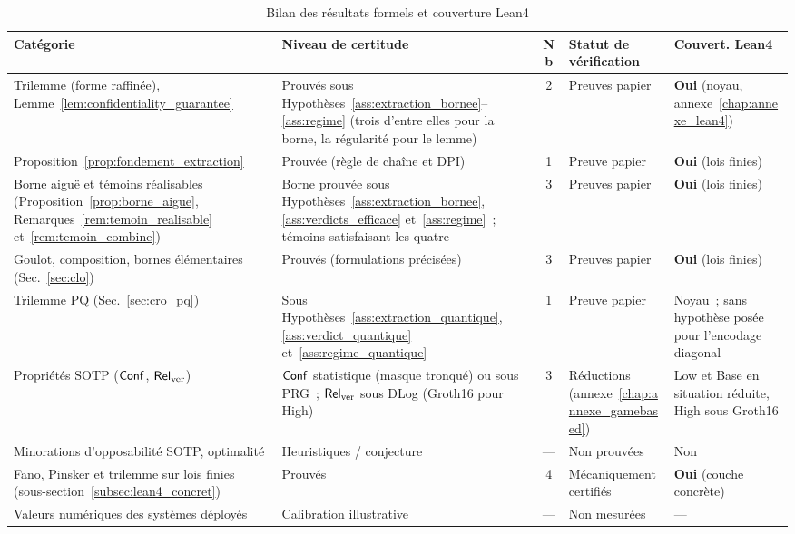 \begin{sloppypar}
\begin{table}[htbp]
\centering
\caption{Bilan des r\'esultats formels et couverture Lean4}
\label{tab:hierarchie_certitude}
\small
\setlength{\tabcolsep}{4pt}     %
\begin{tabular}{@{}p{2.8cm}p{2.8cm}c p{2.5cm}p{2.6cm}@{}}
\toprule
\textbf{Cat\'egorie} & \textbf{Niveau de certitude} & \textbf{Nb} &
\textbf{Statut de v\'erification} & \textbf{Couvert. Lean4} \\
\midrule
Trilemme (forme raffin\'ee), Lemme~\ref{lem:confidentiality_guarantee}
    & Prouv\'es sous Hypoth\`eses~\ref{ass:extraction_bornee}--\ref{ass:regime} (trois d'entre elles pour la borne, la r\'egularit\'e pour le lemme)
  & 2 & Preuves papier  
  & \textbf{Oui} (noyau, annexe~\ref{chap:annexe_lean4}) \\
Proposition~\ref{prop:fondement_extraction}
  & Prouv\'ee (r\`egle de cha\^ine et DPI)
  & 1 & Preuve papier & \textbf{Oui} (lois finies) \\
Borne aigu\"e et t\'emoins r\'ealisables (Proposition~\ref{prop:borne_aigue}, Remarques~\ref{rem:temoin_realisable} et~\ref{rem:temoin_combine})
  & Borne prouv\'ee sous Hypoth\`eses~\ref{ass:extraction_bornee}, \ref{ass:verdicts_efficace} et~\ref{ass:regime}~; t\'emoins satisfaisant les quatre
  & 3 & Preuves papier & \textbf{Oui} (lois finies) \\
Goulot, composition, bornes \'el\'ementaires (Sec.~\ref{sec:clo})  
  & Prouv\'es (formulations pr\'ecis\'ees) 
  & 3 & Preuves papier 
  & \textbf{Oui} (lois finies) \\
Trilemme PQ (Sec.~\ref{sec:cro_pq}) 
    & Sous Hypoth\`eses~\ref{ass:extraction_quantique}, \ref{ass:verdict_quantique} et~\ref{ass:regime_quantique}  
  & 1 & Preuve papier & Noyau~; sans hypoth\`ese pos\'ee pour l'encodage diagonal \\
Propri\'et\'es SOTP ($\mathsf{Conf}$, $\mathsf{Rel}_{\mathrm{ver}}$) 
  & $\mathsf{Conf}$ statistique (masque tronqu\'e) ou sous PRG~; $\mathsf{Rel}_{\mathrm{ver}}$ sous DLog (Groth16 pour High) 
  & 3 & R\'eductions (annexe~\ref{chap:annexe_gamebased}) & Low et Base en situation r\'eduite, High sous Groth16 \\
Minorations d'opposabilit\'e SOTP, optimalit\'e 
  & Heuristiques / conjecture 
  & --- & Non prouv\'ees & Non \\
Fano, Pinsker et trilemme sur lois finies (sous-section~\ref{subsec:lean4_concret})
  & Prouv\'es
  & 4 & M\'ecaniquement certifi\'es
  & \textbf{Oui} (couche concr\`ete) \\
Valeurs num\'eriques des syst\`emes d\'eploy\'es 
  & Calibration illustrative 
  & --- & Non mesur\'ees & --- \\
\bottomrule
\end{tabular}
\end{table}


\end{sloppypar}
